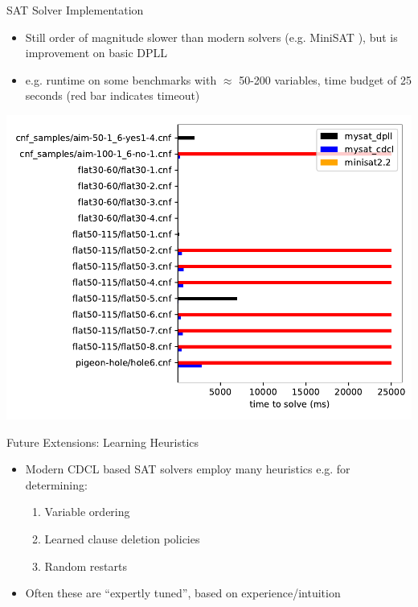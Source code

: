 \documentclass{beamer}
\begin{document}
\begin{frame}{SAT Solver Implementation}
    \begin{itemize}
        \item Still order of magnitude slower than modern solvers (e.g. MiniSAT \cite{04minisat}), but is improvement on basic DPLL
        \pause
        \item e.g. runtime on some benchmarks with $\approx$ 50-200 variables, time budget of 25 seconds (red bar indicates timeout)
    \end{itemize}
    \begin{center}
        \includegraphics[scale=0.45]{../../results/compare.pdf}
    \end{center}
\end{frame}



\begin{frame}{Future Extensions: Learning Heuristics}
    \begin{itemize}
        \item Modern CDCL based SAT solvers employ many heuristics e.g. for determining:
            \begin{enumerate}
                \item Variable ordering
                \item Learned clause deletion policies
                \item Random restarts
            \end{enumerate}
        \item Often these are ``expertly tuned'', based on experience/intuition
    \end{itemize}
\end{frame}
\end{document}

